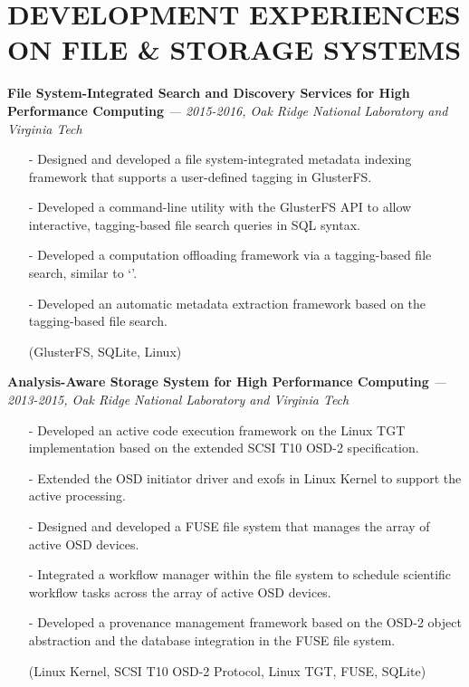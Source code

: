 \section{DEVELOPMENT EXPERIENCES ON FILE \& STORAGE SYSTEMS} 
\vspace{0.03in}
  {\bf File System-Integrated Search and Discovery Services for High Performance Computing}
   {\it \footnotesize --- 2015-2016, Oak Ridge National Laboratory and Virginia Tech}
   \begin{itemize}[leftmargin=*]
    \setlength\itemsep{-0.02in}
    \item[-] Designed and developed a file system-integrated metadata indexing framework
	     that supports a user-defined tagging in GlusterFS.
    \item[-] Developed a command-line utility with the GlusterFS API to
             allow interactive, tagging-based file search queries in SQL syntax.
    \item[-] Developed a computation offloading framework via a tagging-based file search,
             similar to `'.
    \item[-] Developed an automatic metadata
	     extraction framework based on the tagging-based file search.
    \item[] {\small(GlusterFS, SQLite, Linux)}
   \end{itemize}
  \vspace{-0.15in}
  {\bf Analysis-Aware Storage System for High Performance Computing}
    {\it \footnotesize --- 2013-2015, Oak Ridge National Laboratory and Virginia Tech}
    \begin{itemize}[leftmargin=*]
    \setlength\itemsep{-0.02in}
    \item[-] Developed an active code execution framework on the Linux TGT implementation
             based on the extended SCSI T10 OSD-2 specification.
    \item[-] Extended the OSD initiator driver and exofs in Linux Kernel to support the active
             processing.
    \item[-] Designed and developed a FUSE file system that manages
             the array of active OSD devices.
    \item[-] Integrated a workflow manager within the file system to schedule scientific
    workflow tasks across the array of active OSD devices.
    \item[-] Developed a provenance management framework based on the OSD-2 object abstraction
             and the database integration in the FUSE file system.
    \item[] {\small(Linux Kernel, SCSI T10 OSD-2 Protocol, Linux TGT, FUSE, SQLite)}
    \end{itemize}
